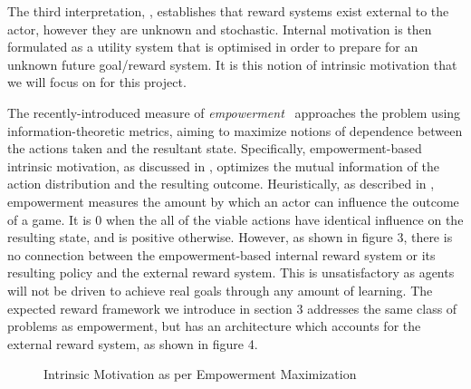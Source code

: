 \documentclass{article}
\begin{document}
The third interpretation, \cite{mohamed2015variational,salge2014empowerment}, establishes that reward systems exist external to the actor, however they are unknown and stochastic. Internal motivation is then formulated as a utility system that is optimised in order to prepare for an unknown future goal/reward system. It is this notion of intrinsic motivation that we will focus on for this project. 

The recently-introduced measure of \emph{empowerment}~\citep{mohamed2015variational, salge2014empowerment} approaches the problem using information-theoretic metrics, aiming to maximize notions of dependence between the actions taken and the resultant state. Specifically, empowerment-based intrinsic motivation, as discussed in \citep{mohamed2015variational}, optimizes the mutual information of the action distribution and the resulting outcome.
Heuristically, as described in \cite{salge2014empowerment}, empowerment measures the amount by which an actor can influence the outcome of a game.
It is $0$ when the all of the viable actions have identical influence on the resulting state, and is positive otherwise. However, as shown in figure 3, there is no connection between the empowerment-based internal reward system or its resulting policy and the external reward system. This is unsatisfactory as agents will not be driven to achieve real goals through any amount of learning. The expected reward framework we introduce in section 3 addresses the same class of problems as empowerment, but has an architecture which accounts for the external reward system, as shown in figure 4. 

\begin{figure}[h]
\centering
{}
\caption{Intrinsic Motivation as per Empowerment Maximization} \label{fig:M3}
\end{figure}
\end{document}
